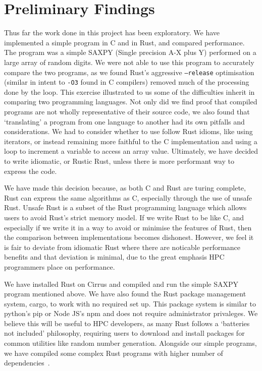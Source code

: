 \documentclass{report}[a4]
\begin{document}
\chapter{Preliminary Findings}
Thus far the work done in this project has been exploratory. We have implemented a simple program in C and in Rust, and compared performance. The program was a simple SAXPY (Single precision A-X plus Y) performed on a large array of random digits. We were not able to use this program to accurately compare the two programs, as we found Rust's aggressive \texttt{--release} optimisation (similar in intent to \texttt{-O3} found in C compilers) removed much of the processing done by the loop. This exercise illustrated to us some of the difficulties inherit in comparing two programming languages. Not only did we find proof that compiled programs are not wholly representative of their source code, we also found that `translating' a program from one language to another had its own pitfalls and considerations. We had to consider whether to use follow Rust idioms, like using iterators, or instead remaining more faithful to the C implementation and using a loop to increment a variable to access an array value. Ultimately, we have decided to write idiomatic, or Rustic Rust, unless there is more performant way to express the code.

We have made this decision because, as both C and Rust are turing complete, Rust can express the same algorithms as C, especially through the use of unsafe Rust. Unsafe Rust is a subset of the Rust programming language which allows users to avoid Rust's strict memory model. If we write Rust to be like C, and especially if we write it in a way to avoid or minimise the features of Rust, then the comparison between implementations becomes dishonest. However, we feel it is fair to deviate from idiomatic Rust where there are noticable performance benefits and that deviation is minimal, due to the great emphasis HPC programmers place on performance.

We have installed Rust on Cirrus and compiled and run the simple SAXPY program mentioned above. We have also found the Rust package management system, cargo, to work with no required set up. This package system is similar to python's pip or Node JS's npm and does not require administrator privaleges. We believe this will be useful to HPC developers, as many Rust follows a `batteries not included' philosophy, requiring users to download and install packages for common utilities like random number generation. Alongside our simple programs, we have compiled some complex Rust programs with higher number of dependencies~\cite{Bat,Exa}.
\end{document}
